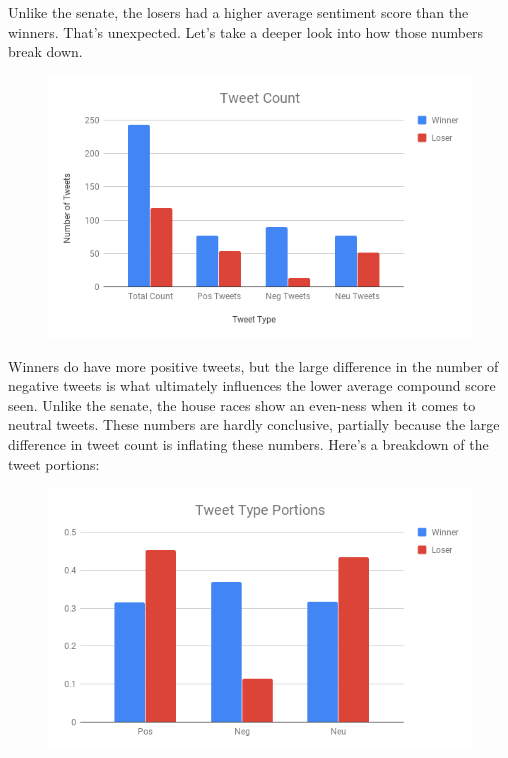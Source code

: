 \documentclass[11pt, twoside, reqno]{book}
\begin{document}
Unlike the senate, the losers had a higher average sentiment score than the winners. That's unexpected. Let's take a deeper look into how those numbers break down. 

\begin{figure}[H]
\centering
	\includegraphics[scale=0.5]{house_tweet_type}
\end{figure}

Winners do have more positive tweets, but the large difference in the number of negative tweets is what ultimately influences the lower average compound score seen. Unlike the senate, the house races show an even-ness when it comes to neutral tweets. These numbers are hardly conclusive, partially because the large difference in tweet count is inflating these numbers. Here's a breakdown of the tweet portions:

\begin{figure}[H]
\centering
	\includegraphics[scale=0.5]{house_tweet_breakdown}
\end{figure}
\end{document}
